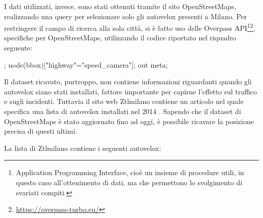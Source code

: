 \documentclass[a4paper,12pt]{report}
\begin{document}
I dati utilizzati, invece, sono stati ottenuti tramite il sito OpenStreetMaps, 
realizzando una query per selezionare solo gli autovelox presenti a Milano. 
Per restringere il campo di ricerca alla sola città, si è fatto uso delle 
Overpass API\footnote{Application Programming Interface, cioè un insieme di 
procedure utili, in questo caso all'ottenimento di dati, ma che permettono 
lo svolgimento di svariati compiti.}\footnote{\url{https://overpass-turbo.eu/}}, 
specifiche per OpenStreetMaps, utilizzando il codice riportato nel riquadro seguente: 

\begin{code}
;
node({{bbox}})["highway"="speed_camera"];
out meta;
\end{code}

Il dataset ricavato, purtroppo, non contiene informazioni riguardanti quando gli 
autovelox siano stati installati, fattore importante per capirne l'effetto 
sul traffico e sugli incidenti. 
Tuttavia il sito web Ztlmilano 
contiene un articolo nel quale specifica una lista di 
autovelox installati nel 2014 \cite{ZTLMILANO:1}. 
Sapendo che il dataset di OpenStreetMaps è stato aggiornato fino ad oggi, 
è possibile ricavare la posizione precisa di questi ultimi. 

La lista di Ztlmilano contiene i seguenti autovelox: 
\end{document}
